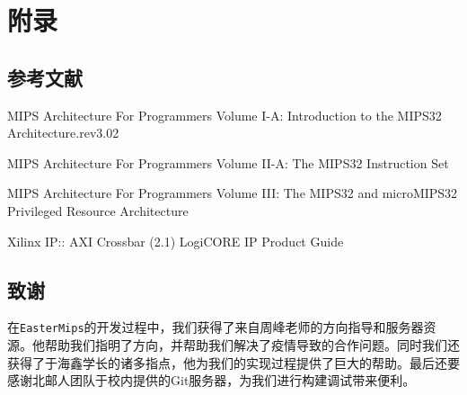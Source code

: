 \chapter{附录}

\section{参考文献}
MIPS\textsuperscript{\textregistered} Architecture For Programmers Volume I-A: Introduction to the MIPS32 Architecture.rev3.02

MIPS\textsuperscript{\textregistered} Architecture For Programmers Volume II-A: The MIPS32\textsuperscript{\textregistered} Instruction Set 

MIPS\textsuperscript{\textregistered} Architecture For Programmers Volume III: The MIPS32\textsuperscript{\textregistered} and microMIPS32\textsuperscript{\texttrademark} Privileged Resource Architecture 

Xilinx IP:: AXI Crossbar (2.1) LogiCORE IP Product Guide

\section{致谢}

在\texttt{EasterMips}的开发过程中，我们获得了来自周峰老师的方向指导和服务器资源。他帮助我们指明了方向，并帮助我们解决了疫情导致的合作问题。同时我们还获得了于海鑫学长的诸多指点，他为我们的实现过程提供了巨大的帮助。最后还要感谢北邮人团队于校内提供的Git服务器，为我们进行构建调试带来便利。